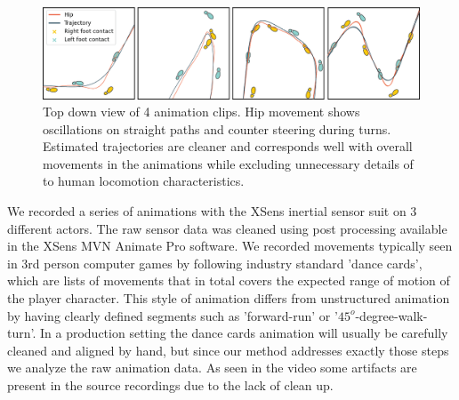 \begin{figure}
    \centering
    \includegraphics[width=1.0\columnwidth]{img/estimated_trajectory_examples_small.png}
    \caption{Top down view of 4 animation clips. Hip movement shows oscillations on straight paths and counter steering during turns. Estimated trajectories are cleaner and corresponds well with overall movements in the animations while excluding unnecessary details of to human locomotion characteristics.}
    \label{fig:results:estimatedtrajectory:examples}
\end{figure}
 
We recorded a series of animations with the XSens inertial sensor suit on 3 different actors. The raw sensor data was cleaned using post processing available in the XSens MVN Animate Pro software. We recorded movements typically seen in 3rd person computer games by following industry standard 'dance cards', which are lists of movements that in total covers the expected range of motion of the player character. This style of animation differs from unstructured animation by having clearly defined segments such as 'forward-run' or '$45^o$-degree-walk-turn'. In a production setting the dance cards animation will usually be carefully cleaned and aligned by hand, but since our method addresses exactly those steps we analyze the raw animation data. As seen in the video some artifacts are present in the source recordings due to the lack of clean up.

